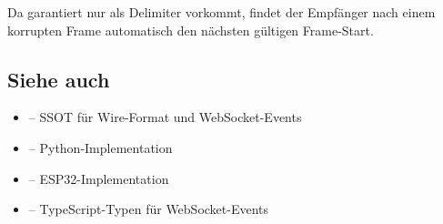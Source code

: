\begin{tipbox}[Resynchronisation]
Da  garantiert nur als Delimiter vorkommt, findet der Empfänger nach einem
korrupten Frame automatisch den nächsten gültigen Frame-Start.
\end{tipbox}

\subsection{Siehe auch}
\label{subsec:serial-siehe-auch}

\begin{itemize}
\item {} -- SSOT für Wire-Format und WebSocket-Events
\item {} -- Python-Implementation
\item {} -- ESP32-Implementation
\item {} -- TypeScript-Typen für WebSocket-Events
\end{itemize}
